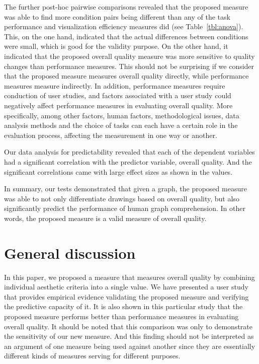 \documentclass[conference,letterpaper]{IEEEtran}
\begin{document}
The further post-hoc pairwise comparisons revealed that the proposed measure was able to find more condition pairs being  different than any of the task performance and visualization efficiency measures did (see Table~\ref{tbl:anova}). This, on the one hand, indicated that the actual differences between conditions were small, which is good for the validity purpose. On the other hand, it indicated that the proposed overall quality measure was more sensitive to quality changes than performance measures. This should not be surprising if we consider that the proposed measure measures overall quality directly, while performance measures measure indirectly. In addition, performance measures require conduction of user studies, and factors associated with a user study could negatively affect performance measures in evaluating overall quality. More specifically, among other factors, human factors, methodological issues, data analysis methods and the choice of tasks can each have a certain role in the evaluation process, affecting the measurement in one way or another.

Our data analysis for predictability revealed that each of the dependent variables had a significant correlation with the predictor variable, overall quality. And the significant correlations came with large effect sizes as shown in the  values. 

In summary, our tests demonstrated that given a graph, the proposed measure was able to not only differentiate drawings based on overall quality, but also significantly predict the performance of human graph comprehension. In other words, the proposed measure is a valid measure of overall quality. 

\section{General discussion}

In this paper, we proposed a measure that measures overall quality by combining individual aesthetic criteria into a single value. We have presented a user study that provides empirical evidence validating the proposed measure and verifying the predictive capacity of it. It is also shown in this particular study that the proposed measure performs better than performance measures in evaluating overall quality. It should be noted that this comparison was only to demonstrate the sensitivity of our new measure. And this finding should not be interpreted as an argument of one measure being used against another since they are essentially different kinds of measures serving for different purposes.
\end{document}
